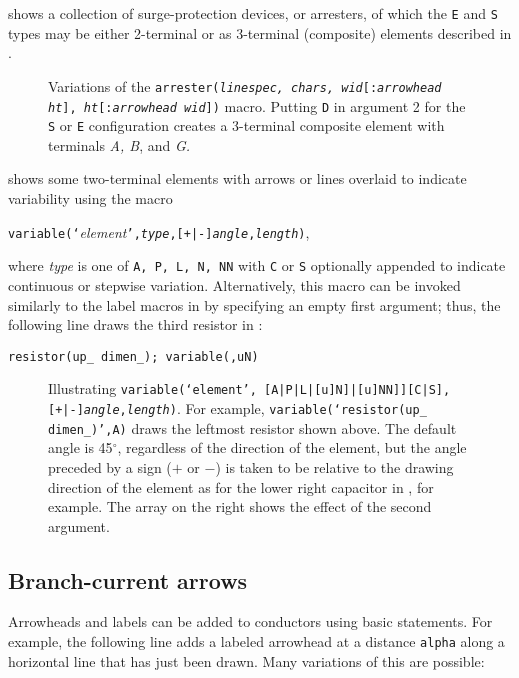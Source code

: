  shows a collection of surge-protection devices, or arresters,
of which the {\tt E} and {\tt S} types may be either 2-terminal or as
3-terminal (composite) elements described in .
\begin{figure}[h!]
   
   \caption{Variations of the {\tt arrester({\sl linespec, chars,}
     {\sl wid}[{\tt :}{\sl arrowhead ht}],
     {\sl ht}[{\tt :}{\sl arrowhead wid}])}
     macro. Putting {\tt D} in argument 2 for the {\tt S} or {\tt E}
     configuration creates a 3-terminal composite element
     with terminals {\sl A, B}, and {\sl G.}}
   \label{Arresters}
   \end{figure}

 shows some two-terminal elements with
arrows or lines overlaid to indicate variability using the macro
\par
{\tt variable(`}{\sl element}{\tt',{\sl type},[+|-]{\sl angle},{\sl length})},

\noindent
where {\sl type} is one of {\tt A, P, L, N, NN} with {\tt C} or {\tt S}
optionally appended to indicate continuous or stepwise variation.
Alternatively, this macro
can be invoked similarly to the label macros in
 by specifying an empty first argument;
thus, the following line draws the third resistor in :
\par
   {\tt resistor(up\_ dimen\_); variable(,uN)}

\begin{figure}[ht]
\vspace*{-\baselineskip}
   
   \caption{Illustrating
{\tt variable(`{\sl element}',%
[A|P|L|[u]N]|[u]NN]][C|S],[+|-]{\sl angle},{\sl length})}.
   For example, {\tt variable(`resistor(up\_ dimen\_)',A)} draws
   the leftmost resistor shown above.
   The default angle is 45${}^{\circ}$, regardless of the direction of
   the element, but the angle preceded by a sign ($+$ or $-$) is taken
   to be relative to the drawing direction of the element as for the
   lower right capacitor in , for example.  The array on
   the right shows the effect of the second argument.}
   \label{Variable}
   \end{figure}

\subsection{Branch-current arrows\label{Branchcurrent:}}
Arrowheads and labels can be added to conductors using basic
\pic statements.  For example, the following line adds a labeled
arrowhead at a distance {\tt alpha} along a horizontal line that has
just been drawn.  Many variations of this are possible:

